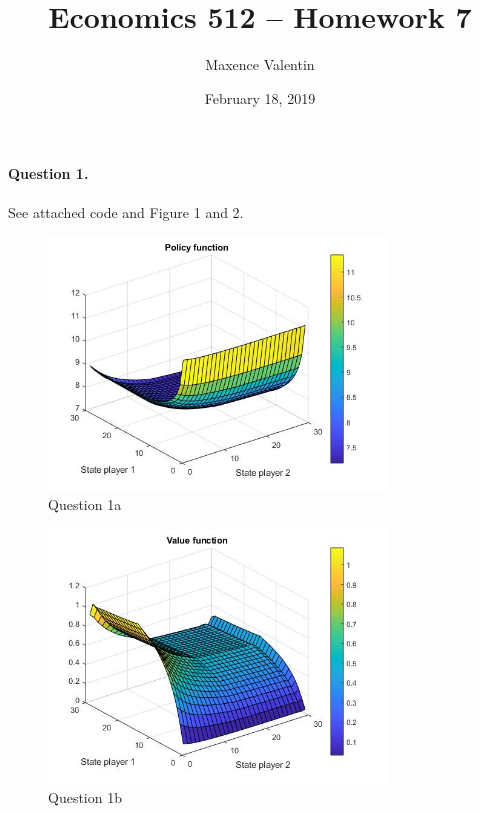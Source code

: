 \documentclass[11pt]{article}
\begin{document}
\onehalfspace

\title{Economics 512 -- Homework 7}
\author{Maxence Valentin}
\date{February 18, 2019}
\maketitle

\paragraph{Question 1.} See attached code and Figure 1 and 2.

\begin{figure}[!h]
	\centering
	\includegraphics[width=0.8\textwidth]{Figures/figure1.jpg}
	\caption{Question 1a}
\end{figure}

\begin{figure}[!h]
	\centering
	\includegraphics[width=0.8\textwidth]{Figures/figure2.jpg}
	\caption{Question 1b}
\end{figure}
\end{document}
